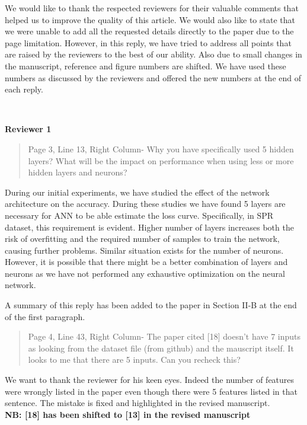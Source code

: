 \documentclass{article}
\begin{document}
	We would like to thank the respected reviewers for their valuable comments that helped us to improve the quality of this article. We would also like to state that we were unable to add all the requested details directly to the paper due to the page limitation. However, in this reply, we have tried to address all points that are raised by the reviewers to the best of our ability. Also due to small changes in the manuscript, reference and figure numbers are shifted. We have used these numbers as discussed by the reviewers and offered the new numbers at the end of each reply.
	
	~
	
	{\bfseries\large Reviewer 1}
	
	\begin{quote}
	Page 3, Line 13, Right Column- Why you have specifically used 5 hidden layers? What will be the impact on performance when using less or more hidden layers and neurons?
	\end{quote}
	
	During our initial experiments, we have studied the effect of the network architecture on the accuracy. During these studies we have found 5 layers are necessary for ANN to be able estimate the loss curve. Specifically, in SPR dataset, this requirement is evident. Higher number of layers increases both the risk of overfitting and the required number of samples to train the network, causing further problems. Similar situation exists for the number of neurons. However, it is possible that there might be a better combination of layers and neurons as we have not performed any exhaustive optimization on the neural network.
	
	A summary of this reply has been added to the paper in Section II-B at the end of the first paragraph.
	
	\begin{quote}
	Page 4, Line 43, Right Column- The paper cited [18] doesn't have 7 inputs as looking from the dataset file (from github) and the mauscript itself. It looks to me that there are 5 inputs. Can you recheck this?
	\end{quote}
	
	We want to thank the reviewer for his keen eyes. Indeed the number of features were wrongly listed in the paper even though there were 5 features listed in that sentence. The mistake is fixed and highlighted in the revised manuscript. \\
	\textbf{NB: [18] has been shifted to [13] in the revised manuscript}
	
\end{document}
